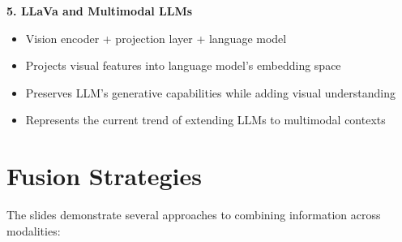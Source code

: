 \textbf{5. LLaVa and Multimodal LLMs}
\begin{itemize}
    \item Vision encoder + projection layer + language model
    \item Projects visual features into language model's embedding space
    \item Preserves LLM's generative capabilities while adding visual understanding
    \item Represents the current trend of extending LLMs to multimodal contexts
\end{itemize}
\section*{Fusion Strategies}

The slides demonstrate several approaches to combining information across modalities:

